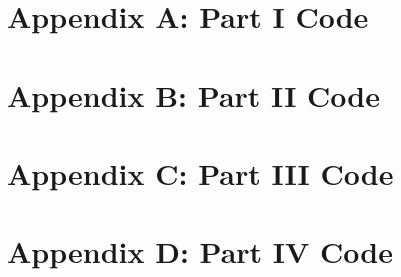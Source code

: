 \documentclass{article}
\begin{document}
\section*{Appendix A: Part I Code}


\section*{Appendix B: Part II Code}


\section*{Appendix C: Part III Code}


\section*{Appendix D: Part IV Code}

\end{document}
